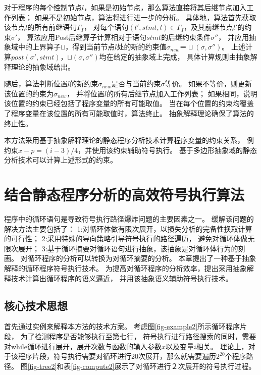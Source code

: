 对于程序的每个控制节点$l$，如果是初始节点，那么算法直接将其后继节点加入工作列表；
如果不是初始节点，算法将进行进一步的分析。
具体地，算法首先获取该节点$l$的所有前继语句$\Gamma_{I}$，
对每个语句$(l',stmt,l)\in \Gamma_{I}$，及其前继节点$l'$的约束$\sigma'$，
算法应用Post后继算子计算相对于语句$stmt$的后继约束条件$\sigma''$，
并应用抽象域中的上界算子$\sqcup$，得到当前节点$l$处的新的约束值$\sigma_{new}　＝　
\sqcup(\sigma,\sigma'')$。
上述计算$post(\sigma', stmt)$，$\sqcup(\sigma,\sigma'')$均在给定的抽象域上完成，
具体计算规则由抽象解释理论的抽象域给出。

随后，算法判断位置$l$的新约束$\sigma_{new}$是否与当前约束$\sigma$等价。
如果不等价，则更新该位置的约束为$\sigma_{new}$，
并将位置$l$的所有后继节点加入工作列表；
如果相同，说明该位置的约束已经包括了程序变量的所有可能取值。
当在每个位置的约束均覆盖了程序变量在该位置的所有可能取值时，算法终止。
抽象解释理论确保了算法的终止性。


本方法采用基于抽象解释理论的静态程序分析技术计算程序变量的约束关系，
例约束$x-p = (i-3)/4$，并使用该约束辅助符号执行。
基于多边形抽象域的静态分析技术可以计算上述形式的约束。

\section{结合静态程序分析的高效符号执行算法}
\label{sec-absint-symexe}

程序中的循环语句是导致符号执行路径爆炸问题的主要因素之一。
缓解该问题的解决方法主要包括了：
1:对循环体做有限次展开，以损失分析的完备性换取计算的可行性；
2:采用特殊的导向策略引导符号执行的路径遍历，
 避免对循环体做无限次展开；
3:基于循环摘要对循环语句进行抽象，该抽象是对循环体行为的刻画。
 对循环程序的分析可以转换为对循环摘要的分析。
本章提出了一种基于抽象解释的循环程序符号执行技术。
为提高对循环程序的分析效率，提出采用抽象解释技术计算出循环程序的语义逼近，
并用该抽象语义辅助符号执行技术。


\subsection{核心技术思想}

首先通过实例来解释本方法的技术方案。
考虑图\ref{fig-example2}所示循环程序片段， 为了检测程序是否能够执行至第七行，
符号执行进行路径搜索的同时，需要对while循环进行展开，展开次数与函数的输入参数$x$以及变量$i$相关。
理论上，对于该程序片段，符号执行需要对循环进行20次展开，那么就需要遍历$2^{20}$个程序路径。
图\ref{fig-tree2}和表\ref{fig-compute2}展示了对循环进行２次展开的符号执行过程。

